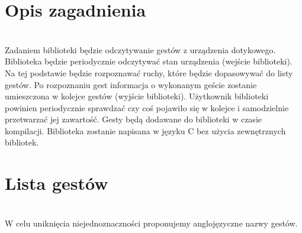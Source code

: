 \documentclass[a4paper,12pt]{article}
\begin{document}
\section{\Large Opis zagadnienia} \ \\[0.1cm]
\indent Zadaniem biblioteki będzie odczytywanie gestów z urządzenia dotykowego. Biblioteka będzie periodycznie odczytywać stan urządzenia (wejście biblioteki). Na tej podstawie będzie rozpoznawać ruchy, które będzie dopasowywać do listy gestów. Po rozpoznaniu gest informacja o wykonanym geście zostanie umieszczona w kolejce gestów (wyjście biblioteki). Użytkownik biblioteki powinien periodycznie sprawdzać czy coś pojawiło się w kolejce i samodzielnie przetwarzać jej zawartość. Gesty będą dodawane do biblioteki w czasie kompilacji. Biblioteka zostanie napisana w języku C bez użycia zewnętrznych bibliotek.



\section{\Large Lista gestów} \ \\[0.1cm]
\indent W celu uniknięcia niejednoznaczności proponujemy anglojęzyczne nazwy gestów.\\
\end{document}
